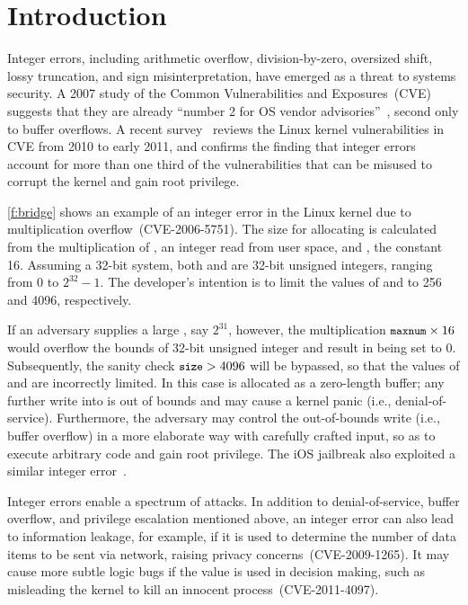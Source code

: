 \section{Introduction}
\label{s:intro}

Integer errors, including arithmetic overflow, division-by-zero,
oversized shift, lossy truncation, and sign misinterpretation, have
emerged as a threat to systems security.  A 2007 study of the
Common Vulnerabilities and Exposures~(CVE)~\cite{cve} suggests that
they are already ``number 2 for OS vendor
advisories''~\cite{christey:vuln}, second only to buffer overflows.
A recent survey~\cite{chen:kbugs} reviews the Linux kernel
vulnerabilities in CVE from 2010 to early 2011, and confirms
the finding that integer errors account for more than one third of
the vulnerabilities that can be misused to corrupt the kernel and
gain root privilege.

\autoref{f:bridge} shows an example of an integer error in the Linux
kernel due to multiplication overflow~(CVE-2006-5751).  The size
for allocating  is calculated from the multiplication of
, an integer read from user space,
and , the constant 16.  Assuming
a 32-bit system, both  and  are 32-bit unsigned
integers, ranging from 0 to $2^{32} - 1$.  The developer's intention
is to limit the values of  and  to 256 and 4096,
respectively.

If an adversary supplies a large , say $2^{31}$, however,
the multiplication $\cc{maxnum} \times 16$ would overflow the bounds
of 32-bit unsigned integer and result in 
being set to 0.  Subsequently, the sanity check $\cc{size} > 4096$
will be bypassed, so that the values of  and 
are incorrectly limited.  In this case  is allocated as
a zero-length buffer; any further write into  is out of
bounds and may cause a kernel panic (i.e., denial-of-service).
Furthermore, the adversary may control the out-of-bounds write
(i.e., buffer overflow) in a more elaborate way with carefully
crafted input, so as to execute arbitrary code and gain root
privilege. The iOS jailbreak also exploited a similar integer 
error~\cite{esser:ios}.

Integer errors enable a spectrum of attacks.  In addition to
denial-of-service, buffer overflow, and privilege escalation
mentioned above, an integer error can also lead to information
leakage, for example, if it is used to determine the number of data
items to be sent via network, raising privacy concerns~(CVE-2009-1265).
It may cause more subtle logic bugs if the value is used in decision
making, such as misleading the kernel to kill an innocent
process~(CVE-2011-4097).

